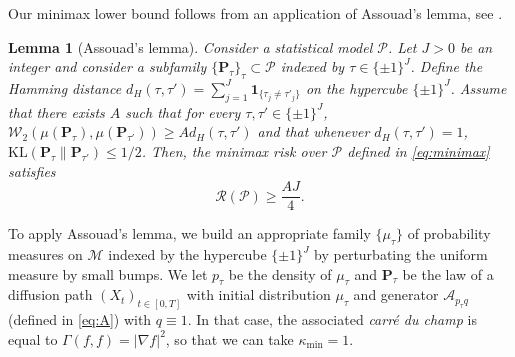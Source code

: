 \documentclass[10pt,a4paper]{article}
\renewcommand{\P}{{\mathbf P}}
\newcommand{\cR}{{\mathcal R}}
\newcommand\cA{\mathcal{A}}
\newcommand\cM{\mathcal{M}}
\newcommand\W{\mathcal{W}}
\newcommand\cP{\mathcal{P}}
\newtheorem{lemma}[theorem]{Lemma}
\begin{document}
Our minimax lower bound follows from an application of Assouad's lemma, see \cite[Theorem 2.12]{Tsybakov2009}. 
\begin{lemma}[Assouad's lemma]
Consider a statistical model $\cP$.   Let $J>0$ be an integer and consider a subfamily $\{\P_\tau\}_\tau\subset \cP$ indexed by $\tau \in \{\pm 1\}^J$. Define the Hamming distance $d_H(\tau,\tau')=\sum_{j=1}^J \mathbf{1}_{\{\tau_j\neq \tau'_j\}}$ on the hypercube $\{\pm 1\}^J$. Assume that there exists $A$ such that for every $\tau,\tau'\in  \{\pm 1\}^J$, $\W_2(\mu(\P_\tau),\mu(\P_{\tau'}))\ge A d_H(\tau,\tau')$ and that whenever $d_H(\tau,\tau')=1$, $\mathrm{KL}(\P_{\tau}\| \P_{\tau'})\le 1/2$. Then, the minimax risk over $\cP$ defined in \eqref{eq:minimax} satisfies
\begin{equation}
    \cR(\cP)\ge \frac{AJ}{4}.
\end{equation}
\end{lemma}

To apply Assouad's lemma, we build an appropriate family $\{\mu_\tau\}$  of probability measures on $\cM$ indexed by the hypercube $\{\pm 1\}^J$ by 
perturbating the uniform measure by small bumps. We let $p_\tau$ be the density of $\mu_\tau$  and $\P_\tau$ be the law of a diffusion path $(X_t)_{t\in [0,T]}$ with initial distribution $\mu_\tau$ and  generator $\cA_{p_\tau q}$ (defined in \eqref{eq:A}) with $q\equiv 1$. In that case, the associated \textit{carré du champ} is equal to $\Gamma(f,f)=|\nabla f|^2$, so that we can take $\kappa_{\min}=1$.
\end{document}
